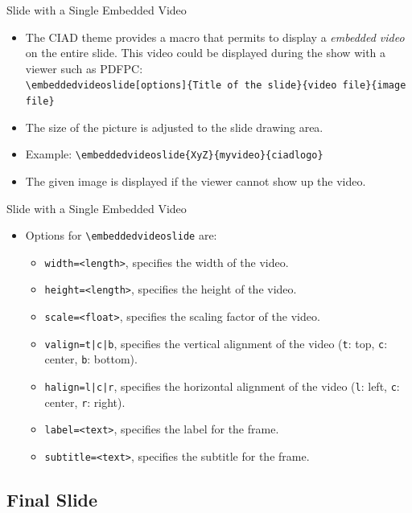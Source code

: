 \documentclass[english,sectioncirclenumberstyle]{ciadbeamer}
\begin{document}
\begin{frame}{Slide with a Single Embedded Video}
	\begin{itemize}
	\item The CIAD theme provides a macro that permits to display a \emph{embedded video} on the entire slide. This video could be displayed during the show with a viewer such as PDFPC: \\
		\texttt{{\textbackslash}embeddedvideoslide[options]\{Title of the slide\}\{video file\}\{image file\}}
	\item The size of the picture is adjusted to the slide drawing area.
	\item Example: \texttt{{\textbackslash}embeddedvideoslide\{XyZ\}\{myvideo\}\{ciadlogo\}} 
	\item The given image is displayed if the viewer cannot show up the video.
	\end{itemize}
\end{frame}

\begin{frame}{Slide with a Single Embedded Video \insertcontinuationtext}
	\begin{itemize}
	\item Options for \texttt{{\textbackslash}embeddedvideoslide} are:
		\begin{itemize}
		\item \texttt{width=<length>}, specifies the width of the video.
		\vfill
		\item \texttt{height=<length>}, specifies the height of the video.
		\vfill
		\item \texttt{scale=<float>}, specifies the scaling factor of the video.
		\vfill
		\item \texttt{valign=t|c|b}, specifies the vertical alignment of the video (\texttt{t}: top, \texttt{c}: center, \texttt{b}: bottom).
		\vfill
		\item \texttt{halign=l|c|r}, specifies the horizontal alignment of the video (\texttt{l}: left, \texttt{c}: center, \texttt{r}: right).
		\vfill
		\item \texttt{label=<text>}, specifies the label for the frame.
		\vfill
		\item \texttt{subtitle=<text>}, specifies the subtitle for the frame.
		\end{itemize}
	\end{itemize}
\end{frame}

\subsection{Final Slide}
\end{document}
